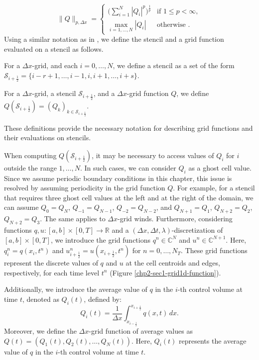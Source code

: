\begin{equation}
	\label{chp2-sec-not1}
	\|Q\|_{p,\Delta x}=
	\begin{cases}
		\bigg( \sum_{i=1}^{N} |Q_i|^p \bigg)^{\frac{1}{p}} & \text{if } 1\leq p < \infty,\\
		\max_{i=1, \ldots, N}{|Q_i|} & \text{otherwise }.
	\end{cases}
\end{equation}
Using a similar notation as in \citet{engwirda:2016}, we define the stencil and a grid function evaluated on a stencil as follows.
\begin{definition}[stencil]
	For a $\Delta x$-grid, and each $i = 0, \ldots, N$, we define a stencil as a set of the form
	$\mathcal{S}_{i+\frac{1}{2}} = \{i-r+1, \ldots, i-1, i, i+1, \ldots, i+s\}$.
\end{definition}
\begin{definition}
	For a $\Delta x$-grid, a stencil $\mathcal{S}_{i+\frac{1}{2}}$,
	 and a $\Delta x$-grid function $Q$, we define $Q(\mathcal{S}_{i+\frac{1}{2}}) = (Q_k)_{k \in \mathcal{S}_{i+\frac{1}{2}}}$.
\end{definition}
These definitions provide the necessary notation for describing grid functions and their evaluations on stencils.

When computing $Q(\mathcal{S}_{i+\frac{1}{2}})$, it may be necessary to access values of $Q_i$ for $i$ outside the range $1,\ldots,N$.
In such cases, we can consider $Q_i$ as a ghost cell value.
Since we assume periodic boundary conditions in this chapter, this issue is resolved by assuming periodicity in the grid function $Q$.
For example, for a stencil that requires three ghost cell values at the left and at the right of the domain, we can assume $Q_{0} = Q_{N}$, $Q_{-1} = Q_{N-1}$, $Q_{-2} = Q_{N-2}$, and
$Q_{N+1}=Q_1$, $Q_{N+2}=Q_2$, $Q_{N+2}=Q_3$. The same applies to $\Delta x$-grid winds.
Furthermore, considering functions $q, u: [a,b]\times[0,T] \to \mathbb{R}$ and a $(\Delta x,\Delta t, \lambda)$-discretization
of $[a,b]\times[0,T]$, we introduce the grid functions $q^n \in \mathbb{C}^{N}$ and $u^n \in \mathbb{C}^{N+1}$. 
Here, ${q}^n_{i} = {q}(x_i, t^{n})$ and $u^n_{i+\frac{1}{2}} = u(x_{i+\frac{1}{2}},t^n)$ for $n=0, \ldots, N_T$.
These grid functions represent the discrete values of $q$ and $u$ at the cell centroids and edges, respectively,
for each time level $t^n$ (Figure \ref{chp2-sec1-grid1d-function}).

Additionally, we introduce the average value of $q$ in the $i$-th control volume at time $t$, denoted as ${Q}_i(t)$, defined by:
\begin{equation}
	\label{chp2-sec1-not2}
	{Q}_i(t) = \frac{1}{\Delta x} \int_{x_{i-\frac{1}{2}}}^{x_{i+\frac{1}{2}}} {q}(x,t) \,dx.
\end{equation}
Moreover, we define the $\Delta x$-grid function of average values as $Q(t) = (Q_1(t), Q_2(t), \ldots, Q_N(t))$.
Here, $Q_i(t)$ represents the average value of $q$ in the $i$-th control volume at time $t$.

